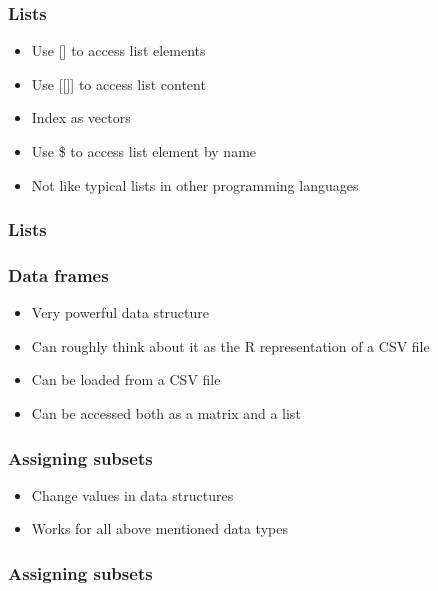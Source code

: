 \documentclass{beamer}
\begin{document}
\begin{frame}
	\frametitle{Lists}
	\begin{itemize}
		\item Use [] to access list elements
		\item Use [[]] to access list content
		\item Index as vectors
		\item Use \$ to access list element by name
		\item Not like typical lists in other programming languages
	\end{itemize}
\end{frame}

\begin{frame}
	\frametitle{Lists}
	\lstIII
\end{frame}

\begin{frame}
	\frametitle{Data frames}
	\begin{itemize}
		\item Very powerful data structure
		\item Can roughly think about it as the R representation of a CSV file
		\item Can be loaded from a CSV file
		\item Can be accessed both as a matrix and a list
	\end{itemize}
\end{frame}


\begin{frame}
	\frametitle{Assigning subsets}
	\begin{itemize}
		\item Change values in data structures
		\item Works for all above mentioned data types 
	\end{itemize}
\end{frame}


\begin{frame}
	\frametitle{Assigning subsets}
	\lstIIII
\end{frame}

\end{document}
